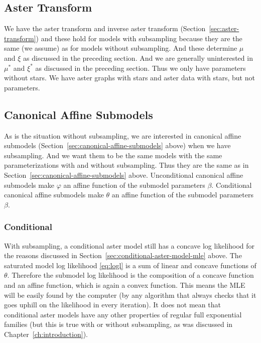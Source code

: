 \subsection{Aster Transform}
\label{sec:aster-transform-subsampling}

We have the aster transform and inverse aster transform
(Section~\ref{sec:aster-transform}) and these hold for models with
subsampling because they are the same (we assume) as for models
without subsampling.  And these determine $\mu$ and $\xi$ as discussed
in the preceding section.  And we are generally uninterested in
$\mu^*$ and $\xi^*$ as discussed in the preceding section.  Thus
we only have parameters without stars.  We have aster graphs with
stars and aster data with stars, but not parameters.

\subsection{Canonical Affine Submodels}

As is the situation without subsampling, we are interested in
canonical affine submodels (Section~\ref{sec:canonical-affine-submodels}
above) when we have subsampling.  And we want them to be the same models
with the same parameterizations with and without subsampling.  Thus they
are the same as in Section~\ref{sec:canonical-affine-submodels} above.
Unconditional canonical affine submodels make $\varphi$ an affine function
of the submodel parameters $\beta$.
Conditional canonical affine submodels make $\theta$ an affine function
of the submodel parameters $\beta$.

\subsubsection{Conditional}

With subsampling, a conditional aster model still has a concave log likelihood
for the reasons discussed in Section~\ref{sec:conditional-aster-model-mle}
above.  The saturated model log likelihood \eqref{eq:logl} is a sum
of linear and concave functions of $\theta$.  Therefore the submodel
log likelihood is the composition of a concave function and an affine
function, which is again a convex function.  This means the MLE will
be easily found by the computer (by any algorithm that always checks
that it goes uphill on the likelihood in every iteration).  It does
not mean that conditional aster models have any other properties of
regular full exponential families (but this is true with or without
subsampling, as was discussed in Chapter~\ref{ch:introduction}).

